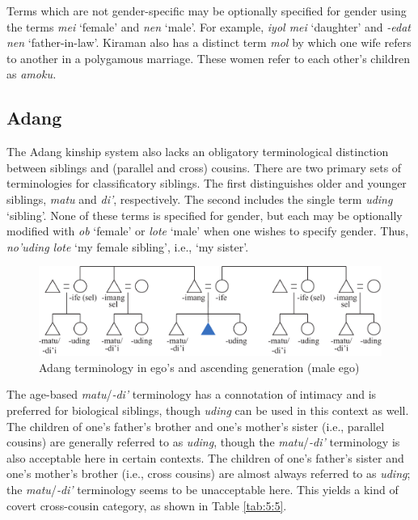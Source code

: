 Terms which are not gender-specific may be optionally specified for gender using the terms \textit{mei} `female' and \textit{nen} `male'. For example, \textit{iyol mei} `daughter' and \textit{{}-edat nen} `father-in-law'. Kiraman also has a distinct term \textit{mol} by which one wife refers to another in a polygamous marriage. These women refer to each other's children as \textit{amoku.} 

\subsection{Adang}\label{sect_adang}
The Adang kinship system also lacks an obligatory terminological distinction between siblings and (parallel and cross) cousins. There are two primary sets of terminologies for classificatory siblings. The first distinguishes older and younger siblings, \textit{matu} and \textit{di'}, respectively. The second includes the single term \textit{uding} `sibling'. None of these terms is specified for gender, but each may be optionally modified with \textit{ob} `female' or \textit{lote} `male' when one wishes to specify gender. Thus, \textit{no'uding lote} `my female sibling', i.e., `my sister'. 

\begin{figure}
 \includegraphics[width=\textwidth]{figures/Holton_ch5_fig9.pdf}
\caption{Adang terminology in ego's and ascending generation (male ego) }
\end{figure}  

The age-based \textit{matu}/\textit{{}-di'} terminology has a connotation of intimacy and is preferred for biological siblings, though \textit{uding} can be used in this context as well. The children of one's father's brother and one's mother's sister (i.e., parallel cousins) are generally referred to as \textit{uding}, though the \textit{matu}/\textit{{}-di'} terminology is also acceptable here in certain contexts. The children of one's father's sister and one's mother's brother (i.e., cross cousins) are almost always referred to as \textit{uding}; the \textit{matu}/\textit{{}-di'} terminology seems to be unacceptable here. This yields a kind of covert cross-cousin category, as shown in Table \ref{tab:5:5}. 




